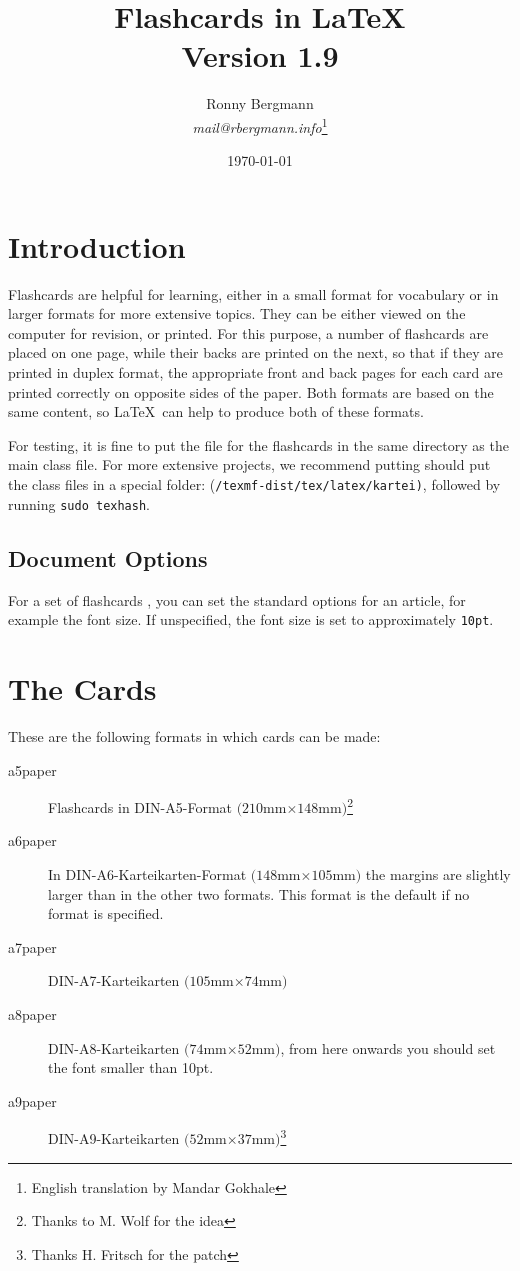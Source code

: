 \documentclass[a4paper,DIV=calc]{scrartcl}
\newcommand{\befehl}[1]{%
\marginpar{\footnotesize\textsf{#1}}%
}
\begin{document}
\title{Flashcards in \LaTeX\\{\large Version 1.9}}
\author{Ronny Bergmann\\\emph{mail@rbergmann.info}\footnote{English translation by Mandar Gokhale}}

\date{\today}
\maketitle
\section{Introduction}

Flashcards are helpful for learning, either in a small format for
vocabulary or in larger formats for more extensive topics. They can be
either viewed on the computer for revision, or printed. For this
purpose, a number of flashcards are placed on one page, while their
backs are printed on the next, so that if they are printed in duplex
format, the appropriate front and back pages for each card are printed
correctly on opposite sides of the paper. Both formats are based on
the same content, so \LaTeX\ can help to produce both of these
formats.


For testing, it is fine to put the file for the flashcards in the same
directory as the main class file. For more extensive projects, we
recommend putting should put the class files in a special folder:
(\lstinline!/texmf-dist/tex/latex/kartei)!, followed by running
\lstinline!sudo texhash!.

\subsection{Document Options}
For a set of flashcards \befehl{\textbackslash document-\\class\{kartei\}},
you can set the standard options for an article, for example the font size.
If unspecified, the font size is set to approximately \lstinline!10pt!.
  
\section{The Cards}
\befehl{aXpaper}
These are the following formats in which cards can be made:
\begin{description}
  \item[a5paper] Flashcards in DIN-A5-Format $(210$mm$\times 148$mm$)$\footnote{Thanks to M. Wolf for the idea}
  \item[a6paper] In DIN-A6-Karteikarten-Format $(148$mm$\times 105$mm$)$ the margins are slightly larger than in the other two formats. This format is the default if no format is specified.
  \item[a7paper] DIN-A7-Karteikarten $(105$mm$\times 74$mm$)$
  \item[a8paper] DIN-A8-Karteikarten $(74$mm$\times 52$mm$)$, from here onwards you should set the font
    smaller than 10pt.
  \item[a9paper] DIN-A9-Karteikarten $(52$mm$\times 37$mm$)$\footnote{Thanks H. Fritsch for the patch}  
\end{description}
\end{document}
